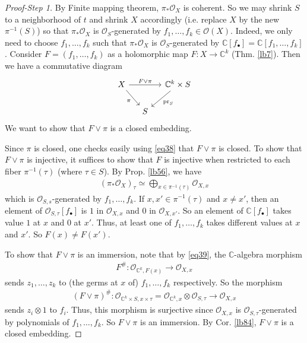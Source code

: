 \documentclass[12pt,b5paper,notitlepage]{report}
\theoremstyle{definition}
\theoremstyle{plain}
\newcommand{\wht}{\widehat}
\newcommand{\scr}{\mathscr}
\newcommand{\blt}{\bullet}
\newcommand{\Cbb}{\mathbb C}
\newcommand{\pr}{\mathrm {pr}}
\numberwithin{equation}{section}
\begin{document}
\begin{proof}[Proof-Step 1]
By Finite mapping theorem, $\pi_*\scr O_X$ is coherent. So we may shrink $S$ to a neighborhood of $t$ and shrink $X$ accordingly (i.e. replace $X$ by the new $\pi^{-1}(S)$) so that $\pi_*\scr O_X$ is $\scr O_S$-generated by $f_1,\dots,f_k\in\scr O(X)$. Indeed, we only need to choose $f_1,\dots,f_k$ such that $\pi_*\scr O_X$ is $\scr O_S$-generated by $\Cbb[f_\blt]=\Cbb[f_1,\dots,f_k]$. Consider $F=(f_1,\dots,f_k)$ as a holomorphic map $F:X\rightarrow\Cbb^k$ (Thm. \ref{lb7}). Then we have a commutative diagram
\begin{equation}\label{eq38}
\begin{tikzcd}[column sep=small]
X\arrow[rd,"\pi"'] \arrow[rr,"F\vee\pi"] &   & \Cbb^k\times S \arrow[ld,"\pr_S"] \\
                        & S &             
\end{tikzcd}
\end{equation}
We want to show that $F\vee\pi$ is a closed embedding.

Since $\pi$ is closed, one checks easily using \eqref{eq38} that $F\vee\pi$ is closed. To show that $F\vee\pi$ is injective, it suffices to show that $F$ is injective when restricted to each fiber $\pi^{-1}(\tau)$ (where $\tau\in S$). By Prop. \ref{lb56}, we have
\begin{align}
(\pi_*\scr O_X)_\tau\simeq\bigoplus_{x\in\pi^{-1}(\tau)}\scr O_{X,x}\label{eq39}
\end{align}
which is $\scr O_{S,s}$-generated by $f_1,\dots,f_k$. If $x,x'\in\pi^{-1}(\tau)$ and $x\neq x'$, then an element of $\scr O_{S,\tau}[f_\blt]$ is $1$ in $\scr O_{X,x}$ and $0$ in $\scr O_{X,x'}$. So an element of $\Cbb[f_\blt]$ takes value $1$ at $x$ and $0$ at $x'$. Thus, at least one of $f_1,\dots,f_k$ takes different values at $x$ and $x'$. So $F(x)\neq F(x')$. 

To show that $F\vee\pi$ is an immersion, note that by \eqref{eq39}, the $\Cbb$-algebra morphism
\begin{align*}
F^\#:\scr O_{\Cbb^k,F(x)}\rightarrow \scr O_{X,x}
\end{align*}
sends $z_1,\dots,z_k$ to (the germs at $x$ of) $f_1,\dots,f_k$ respectively. So the morphism
\begin{align*}
(F\vee\pi)^\#:\scr O_{\Cbb^k\times S,x\times \tau}=\scr O_{\Cbb^k,x}\wht\otimes\scr O_{S,\tau} \longrightarrow \scr O_{X,x}
\end{align*}
sends $z_i\otimes 1$ to $f_i$. Thus, this morphism is surjective since $\scr O_{X,x}$ is $\scr O_{S,\tau}$-generated by polynomials of $f_1,\dots,f_k$. So $F\vee\pi$ is an immersion. By Cor. \ref{lb84}, $F\vee\pi$ is a closed embedding.
\end{proof}
\end{document}
